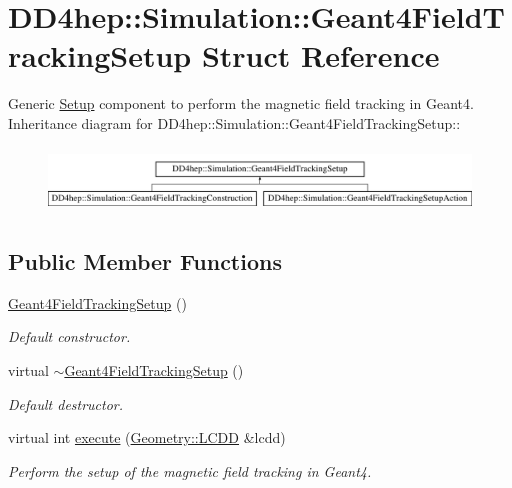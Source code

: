 \hypertarget{struct_d_d4hep_1_1_simulation_1_1_geant4_field_tracking_setup}{
\section{DD4hep::Simulation::Geant4FieldTrackingSetup Struct Reference}
\label{struct_d_d4hep_1_1_simulation_1_1_geant4_field_tracking_setup}
}


Generic \hyperlink{namespace_d_d4hep_1_1_simulation_1_1_setup}{Setup} component to perform the magnetic field tracking in Geant4.  
Inheritance diagram for DD4hep::Simulation::Geant4FieldTrackingSetup::\begin{figure}[H]
\begin{center}
\leavevmode
\includegraphics[height=1.73375cm]{struct_d_d4hep_1_1_simulation_1_1_geant4_field_tracking_setup}
\end{center}
\end{figure}
\subsection*{Public Member Functions}
\begin{DoxyCompactItemize}
\item 
\hyperlink{struct_d_d4hep_1_1_simulation_1_1_geant4_field_tracking_setup_a282e719af272a3ea7fff2e80b5501539}{Geant4FieldTrackingSetup} ()
\begin{DoxyCompactList}\small\item\em Default constructor. \item\end{DoxyCompactList}\item 
virtual \hyperlink{struct_d_d4hep_1_1_simulation_1_1_geant4_field_tracking_setup_a2ada20da4d69771adbef82115109712e}{$\sim$Geant4FieldTrackingSetup} ()
\begin{DoxyCompactList}\small\item\em Default destructor. \item\end{DoxyCompactList}\item 
virtual int \hyperlink{struct_d_d4hep_1_1_simulation_1_1_geant4_field_tracking_setup_a357240d7fa878959f164ab2050598b8e}{execute} (\hyperlink{class_d_d4hep_1_1_geometry_1_1_l_c_d_d}{Geometry::LCDD} \&lcdd)
\begin{DoxyCompactList}\small\item\em Perform the setup of the magnetic field tracking in Geant4. \item\end{DoxyCompactList}\end{DoxyCompactItemize}
